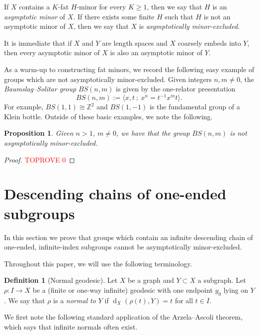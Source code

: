 \documentclass[10pt,a4paper]{amsart}
\DeclareMathOperator{\dist}{d}
\newcommand{\Z}{\mathbb{Z}}
\newcommand{\pres}[2]{\langle #1 \ ; \ #2 \rangle}
\newtheorem{proposition}[theorem]{Proposition}
\theoremstyle{definition}
\newtheorem{definition}[theorem]{Definition}
\begin{document}
If $X$ contains a $K$-fat $H$-minor for every $K \geq 1$, then we say that $H$ is an \textit{asymptotic minor} of $X$. If there exists some finite $H$ such that $H$ is not an asymptotic minor of $X$, then we say that $X$ is \textit{asymptotically minor-excluded}. 

It is immediate that if $X$ and $Y$ are length spaces and $X$ coarsely embeds into $Y$, then every asymptotic minor of $X$ is also an asymptotic minor of $Y$.

As a warm-up to constructing fat minors, we record the following easy example of groups which are not asymptotically minor-excluded. 
Given integers $n, m \neq 0$, the \textit{Baumslag--Solitar group} $BS(n,m)$ is given by the one-relator presentation
$$
BS(n,m) := \pres{x,t}{x^n = t^{-1} x^m t}.
$$
For example, $BS(1,1) \cong \Z^2$ and $BS(1,-1)$ is the fundamental group of a Klein bottle. Outside of these basic examples, we note the following. 

\begin{proposition}\label{lem:bs}
    Given $n > 1$, $m \neq 0$, we have that the group $BS(n,m)$ is not asymptotically minor-excluded.
\end{proposition}
     

\begin{proof}\textcolor{red}{TOPROVE 0}\end{proof}




\section{Descending chains of one-ended subgroups}\label{sec:desc-chain}

In this section we prove that groups which contain an infinite descending chain of one-ended, infinite-index subgroups cannot be asymptotically minor-excluded. 

Throughout this paper, we will use the following terminology. 

\begin{definition}[Normal geodesic]\label{def:normal}
	Let $X$ be a graph and $Y \subset X$ a subgraph. 
    Let $\rho : I \to X$ be a (finite or one-way infinite) geodesic with one endpoint $y_0$ lying on $Y$. We say that $\rho$ is a \textit{normal to $Y$} if 
    $
    \dist_X(\rho(t), Y) = t
    $
    for all $t \in I$. 
\end{definition}
 
We first note the following standard application of the Arzela--Ascoli theorem, which says that infinite normals often exist.
\end{document}
